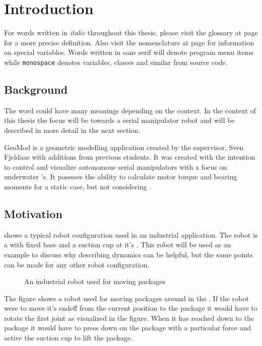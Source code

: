 \chapter{Introduction}

For words written in \textit{italic} throughout this thesis, please visit the glossary at page \pageref{glossary} for a more precise definition. Also visit the nomenclature at page \pageref{nomenclature} for information on special variables. Words written in \textsf{sans serif} will denote program menu items while \texttt{monospace} denotes variables, classes and similar from source code.

\section{Background}

The word  could have many meanings depending on the context. In the context of this thesis the focus will be towards a serial manipulator robot and will be described in more detail in the next section.

GeoMod is a geometric modelling application created by the supervisor, Sven Fjeldaas with additions from previous students. It was created with the intention to control and visualize autonomous serial manipulators with a focus on underwater 's. It posesses the ability to calculate motor torque and bearing moments for a static case, but not considering .

\section{Motivation}

 shows a typical robot configuration used in an industrial application. The robot is a  with fixed base and a suction cup at it's . This robot will be used as an example to discuss why describing dynamics can be helpful, but the same points can be made for any other robot configuration.

\begin{figure}[h!]    
    \centering           
    \def\svgwidth{.8\columnwidth}
    
    \caption{An industrial robot used for moving packages}
    \label{exampleCase}
\end{figure}

The figure shows a robot used for moving packages around in the . If the robot were to move it's \gls{endeff} from the current position to the package it would have to rotate the first joint as visualized in the figure. When it has reached down to the package it would have to press down on the package with a particular force and active the suction cup to lift the package.

